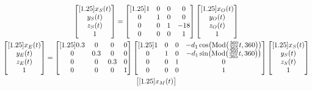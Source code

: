 \begin{subequations}
    \begin{gather}
    \begin{bmatrix}[1.25]
    x_S(t) \\
    y_S(t) \\
    z_S(t) \\
    1
    \end{bmatrix} = 
    \begin{bmatrix}[1.25]
    1 & 0 & 0 & 0 \\
    0 & 1 & 0 & 0 \\
    0 & 0 & 1 & -18 \\
    0 & 0 & 0 & 1
    \end{bmatrix} 
    \begin{bmatrix}[1.25]
    x_O(t) \\
    y_O(t) \\
    z_O(t) \\
    1
    \end{bmatrix}
    \label{eq-sun}
    \\
    \begin{bmatrix}[1.25]
    x_E(t) \\
    y_E(t) \\
    z_E(t) \\
    1
    \end{bmatrix} = 
    \begin{bmatrix}[1.25]
    0.3 & 0 & 0 & 0 \\
    0 & 0.3 & 0 & 0 \\
    0 & 0 & 0.3 & 0 \\
    0 & 0 & 0 & 1
    \end{bmatrix} 
    \begin{bmatrix}[1.25]
    1 & 0 & 0 & -d_1\cos\parens*{\text{Mod}\parens*{\frac{360}{365}t,360}} \\
    0 & 1 & 0 & -d_1\sin\parens*{\text{Mod}\parens*{\frac{360}{365}t,360}} \\
    0 & 0 & 1 & 0 \\
    0 & 0 & 0 & 1
    \end{bmatrix} 
    \begin{bmatrix}[1.25]
    x_S(t) \\
    y_S(t) \\
    z_S(t) \\
    1
    \end{bmatrix}
    \label{eq-earth}
    \\
    \begin{bmatrix}[1.25]
    x_M(t) \\

\end{bmatrix}
\end{gather}
\end{subequations}
